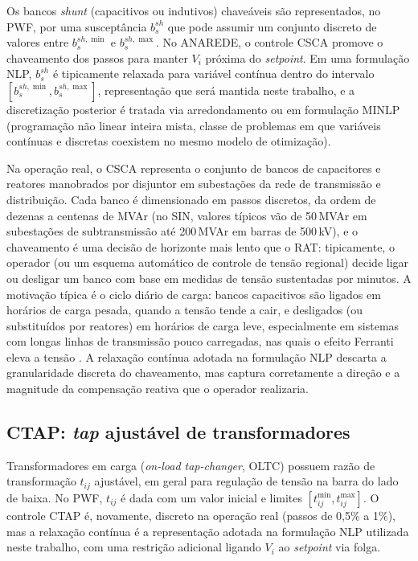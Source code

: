 Os bancos \textit{shunt} (capacitivos ou indutivos) chaveáveis são representados, no PWF, por uma susceptância $b^{sh}_s$ que pode assumir um conjunto discreto de valores entre $b^{sh,\min}_s$ e $b^{sh,\max}_s$. No ANAREDE, o controle CSCA promove o chaveamento dos passos para manter $V_i$ próxima do \textit{setpoint}. Em uma formulação NLP, $b^{sh}_s$ é tipicamente relaxada para variável contínua dentro do intervalo $[b^{sh,\min}_s, b^{sh,\max}_s]$, representação que será mantida neste trabalho, e a discretização posterior é tratada via arredondamento ou em formulação MINLP (programação não linear inteira mista, classe de problemas em que variáveis contínuas e discretas coexistem no mesmo modelo de otimização).

Na operação real, o CSCA representa o conjunto de bancos de capacitores e reatores manobrados por disjuntor em subestações da rede de transmissão e distribuição. Cada banco é dimensionado em passos discretos, da ordem de dezenas a centenas de MVAr (no SIN, valores típicos vão de 50\,MVAr em subestações de subtransmissão até 200\,MVAr em barras de 500\,kV), e o chaveamento é uma decisão de horizonte mais lento que o RAT: tipicamente, o operador (ou um esquema automático de controle de tensão regional) decide ligar ou desligar um banco com base em medidas de tensão sustentadas por minutos. A motivação típica é o ciclo diário de carga: bancos capacitivos são ligados em horários de carga pesada, quando a tensão tende a cair, e desligados (ou substituídos por reatores) em horários de carga leve, especialmente em sistemas com longas linhas de transmissão pouco carregadas, nas quais o efeito Ferranti eleva a tensão \cite{miller1982reactive, kundur1994stability}. A relaxação contínua adotada na formulação NLP descarta a granularidade discreta do chaveamento, mas captura corretamente a direção e a magnitude da compensação reativa que o operador realizaria.

\subsection{CTAP: \textit{tap} ajustável de transformadores}
\label{subsec:ctap}

Transformadores em carga (\textit{on-load tap-changer}, OLTC) possuem razão de transformação $t_{ij}$ ajustável, em geral para regulação de tensão na barra do lado de baixa. No PWF, $t_{ij}$ é dada com um valor inicial e limites $[t^{\min}_{ij}, t^{\max}_{ij}]$. O controle CTAP é, novamente, discreto na operação real (passos de 0,5\% a 1\%), mas a relaxação contínua é a representação adotada na formulação NLP utilizada neste trabalho, com uma restrição adicional ligando $V_i$ ao \textit{setpoint} via folga.

